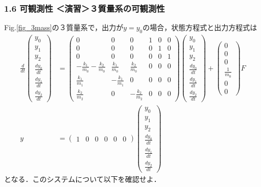 \begin{frame}[t]
\frametitle{1.6 可観測性 ＜演習＞３質量系の可観測性}
Fig.\ref{fig_3mass}の３質量系で，出力が$y=y_0$の場合，状態方程式と出力方程式は
\small{
\begin{align}
 \frac{d}{dt} \left(\begin{array}{c}
           y_0 \\
         y_1 \\
         y_2 \\
         \frac{dy_0}{dt} \\
         \frac{dy_1}{dt} \\
         \frac{dy_2}{dt}
        \end{array}\right)
 &=
 \left(\begin{array}{cccccc}
        0 & 0 & 0 & 1 & 0 & 0      \\
        0 & 0 & 0 & 0 & 1 & 0      \\
        0 & 0 & 0 & 0 & 0 & 1      \\
  -\frac{k_1}{m_0} -\frac{k_2}{m_0}&  \frac{k_1}{m_0} &  \frac{k_2}{m_0} & 0 & 0 & 0 \\
   \frac{k_1}{m_1}                & -\frac{k_1}{m_1} &  0               & 0 & 0 & 0 \\
   \frac{k_2}{m_2}                &  0               & -\frac{k_2}{m_2} & 0 & 0 & 0
       \end{array}\right)
 \left(\begin{array}{c}
           y_0 \\
         y_1 \\
         y_2 \\
         \frac{dy_0}{dt} \\
         \frac{dy_1}{dt} \\
         \frac{dy_2}{dt}
       \end{array}\right)
 +
 \left(\begin{array}{c}
        0 \\
        0 \\
        0 \\
      \frac{1}{m_0} \\
      0 \\
      0
       \end{array}\right)
        F
\nonumber
\\
y &=
 \left(\begin{array}{cccccc}
         1 & 0 & 0 & 0 & 0 & 0
       \end{array}\right)
 \left(\begin{array}{c}
           y_0 \\
         y_1 \\
         y_2 \\
         \frac{dy_0}{dt} \\
         \frac{dy_1}{dt} \\
         \frac{dy_2}{dt}
       \end{array}\right)
\nonumber
\end{align}
}
となる．このシステムについて以下を確認せよ．


\end{frame}
